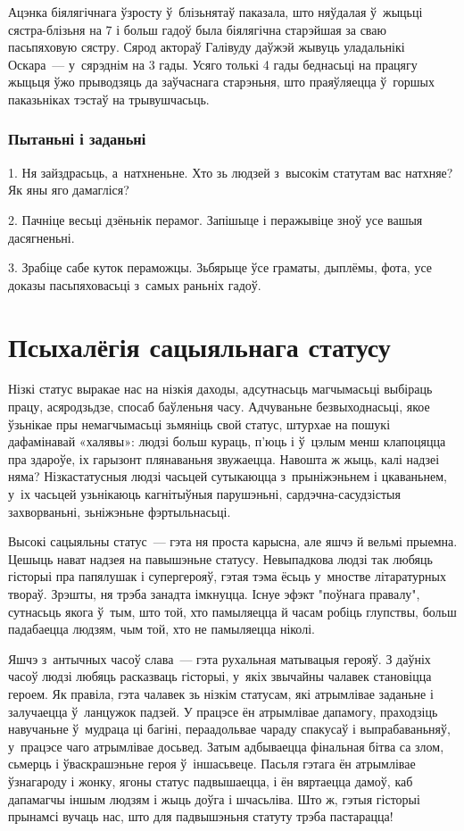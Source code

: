 Ацэнка біялягічнага ўзросту ў~блізьнятаў паказала, што няўдалая ў~жыцьці сястра-блізьня на 7 і больш гадоў была біялягічна старэйшая за сваю пасьпяховую сястру. Сярод актораў Галівуду даўжэй жывуць уладальнікі Оскара~--- у~сярэднім на 3 гады. Усяго толькі 4 гады беднасьці на працягу жыцьця ўжо прыводзяць да заўчаснага старэньня, што праяўляецца ў~горшых паказьніках тэстаў на трывушчасьць.

\subsubsection{Пытаньні і заданьні}

1. Ня зайздрасьць, а~натхненьне. Хто зь людзей з~высокім статутам вас натхняе? Як яны яго дамагліся?

2. Пачніце весьці дзёньнік перамог. Запішыце і перажывіце зноў усе вашыя дасягненьні.

3. Зрабіце сабе куток пераможцы. Зьбярыце ўсе граматы, дыплёмы, фота, усе доказы пасьпяховасьці з~самых раньніх гадоў.


\section{Псыхалёгія сацыяльнага статусу}

Нізкі статус выракае нас на нізкія даходы, адсутнасьць магчымасьці выбіраць працу, асяродзьдзе, спосаб баўленьня часу. Адчуваньне безвыходнасьці, якое ўзьнікае пры немагчымасьці зьмяніць свой статус, штурхае на пошукі дафамінавай «халявы»: людзі больш кураць, п'юць і ў~цэлым менш клапоцяцца пра здароўе, іх гарызонт плянаваньня звужаецца. Навошта ж жыць, калі надзеі няма? Нізкастатусныя людзі часьцей сутыкаюцца з~прыніжэньнем і цкаваньнем, у~іх часьцей узьнікаюць кагнітыўныя парушэньні, сардэчна-сасудзістыя захворваньні, зьніжэньне фэртыльнасьці.

Высокі сацыяльны статус~--- гэта ня проста карысна, але яшчэ й вельмі прыемна. Цешыць нават надзея на павышэньне статусу. Невыпадкова людзі так любяць гісторыі пра папялушак і супергерояў, гэтая тэма ёсьць у~мностве літаратурных твораў. Зрэшты, ня трэба занадта імкнуцца. Існуе эфэкт "поўнага правалу", сутнасьць якога ў~тым, што той, хто памыляецца й часам робіць глупствы, больш падабаецца людзям, чым той, хто не памыляецца ніколі.

Яшчэ з~антычных часоў слава~--- гэта рухальная матывацыя герояў. З даўніх часоў людзі любяць расказваць гісторыі, у~якіх звычайны чалавек становіцца героем. Як правіла, гэта чалавек зь нізкім статусам, які атрымлівае заданьне і залучаецца ў~ланцужок падзей. У працэсе ён атрымлівае дапамогу, праходзіць навучаньне ў~мудраца ці багіні, пераадольвае чараду спакусаў і выпрабаваньняў, у~працэсе чаго атрымлівае досьвед. Затым адбываецца фінальная бітва са злом, сьмерць і ўваскрашэньне героя ў~іншасьвеце. Пасьля гэтага ён атрымлівае ўзнагароду і жонку, ягоны статус падвышаецца, і ён вяртаецца дамоў, каб дапамагчы іншым людзям і жыць доўга і шчасьліва. Што ж, гэтыя гісторыі прынамсі вучаць нас, што для падвышэньня статуту трэба пастарацца!

